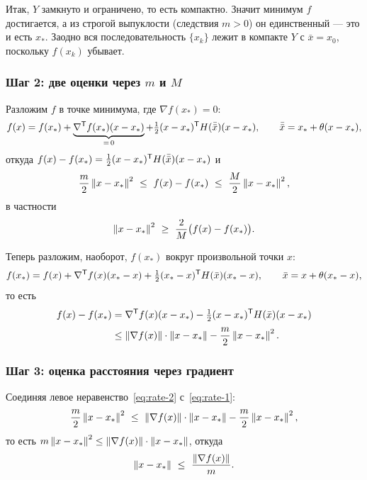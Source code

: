 \begin{idea}
Итак, $Y$ замкнуто и ограничено, то есть компактно. Значит минимум $f$
достигается, а из строгой выпуклости (следствия $m > 0$) он единственный —
это и есть $x_*$. Заодно вся последовательность $\{x_k\}$ лежит в
компакте $Y$ с $\bar x = x_0$, поскольку $f(x_k)$ убывает.
\end{idea}

\subsubsection*{Шаг 2: две оценки через $m$ и $M$}

Разложим $f$ в точке минимума, где $\nabla f(x_*) = 0$:
\[
  f(x) = f(x_*) + \underbrace{\nabla^{\mathsf{T}} f(x_*)(x - x_*)}_{=\,0}
       + \tfrac12 (x - x_*)^{\mathsf{T}} H(\bar{\bar x})(x - x_*) ,
  \qquad \bar{\bar x} = x_* + \theta(x - x_*) ,
\]
откуда $f(x) - f(x_*) = \tfrac12 (x-x_*)^{\mathsf{T}} H(\bar{\bar x})(x-x_*)$ и
\begin{equation}\label{eq:rate-2}
  \frac{m}{2}\left\lVert x - x_* \right\rVert^2 \ \le\ f(x) - f(x_*)
  \ \le\ \frac{M}{2}\left\lVert x - x_* \right\rVert^2 ,
\end{equation}
в частности
\begin{equation}\label{eq:rate-3}
  \left\lVert x - x_* \right\rVert^2 \ \ge\ \frac{2}{M}\big(f(x) - f(x_*)\big) .
\end{equation}

Теперь разложим, наоборот, $f(x_*)$ вокруг произвольной точки $x$:
\[
  f(x_*) = f(x) + \nabla^{\mathsf{T}} f(x)(x_* - x)
         + \tfrac12 (x_* - x)^{\mathsf{T}} H(\bar x)(x_* - x) ,
  \qquad \bar x = x + \theta(x_* - x) ,
\]
то есть
\begin{equation}\label{eq:rate-1}
  \begin{aligned}
    f(x) - f(x_*)
    &= \nabla^{\mathsf{T}} f(x)(x - x_*) - \tfrac12 (x - x_*)^{\mathsf{T}} H(\bar x)(x - x_*) \\[2pt]
    &\le \left\lVert \nabla f(x) \right\rVert\cdot\left\lVert x - x_* \right\rVert - \frac{m}{2}\left\lVert x-x_* \right\rVert^2 .
  \end{aligned}
\end{equation}

\subsubsection*{Шаг 3: оценка расстояния через градиент}

Соединяя левое неравенство~\eqref{eq:rate-2} с~\eqref{eq:rate-1}:
\[
  \frac{m}{2}\left\lVert x-x_* \right\rVert^2
  \ \le\ \left\lVert \nabla f(x) \right\rVert\cdot\left\lVert x-x_* \right\rVert - \frac{m}{2}\left\lVert x-x_* \right\rVert^2 ,
\]
то есть $m\left\lVert x-x_* \right\rVert^2 \le \left\lVert \nabla f(x) \right\rVert\cdot\left\lVert x-x_* \right\rVert$, откуда
\begin{equation}\label{eq:rate-4}
  \left\lVert x - x_* \right\rVert \ \le\ \frac{\left\lVert \nabla f(x) \right\rVert}{m} .
\end{equation}

